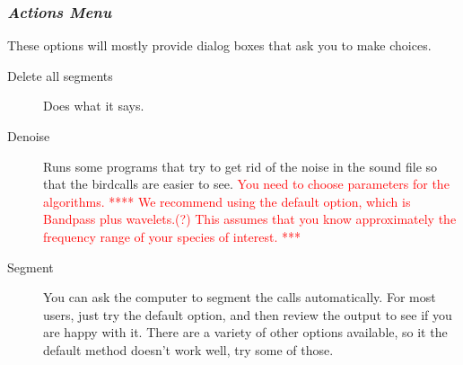 \documentclass{article}
\begin{document}
\subsubsection{{\em Actions Menu}}
\label{sec:action}

These options will mostly provide dialog boxes that ask you to make choices. 

\begin{description}
\item [Delete all segments] Does what it says. 
\item [Denoise] Runs some programs that try to get rid of the noise in the sound file so that the birdcalls are easier to see. \textcolor{red}{You need to choose parameters for the algorithms.
**** We recommend using the default option, which is Bandpass plus wavelets.(?) This assumes that you know approximately the frequency range of your species of interest. ***}
\item [Segment] You can ask the computer to segment the calls automatically. 
For most users, just try the default option, and then review the output to see if you are happy with it. There are a variety of other options available, so it the default method doesn't work well, try some of those. 
 

\end{description}
\end{document}
